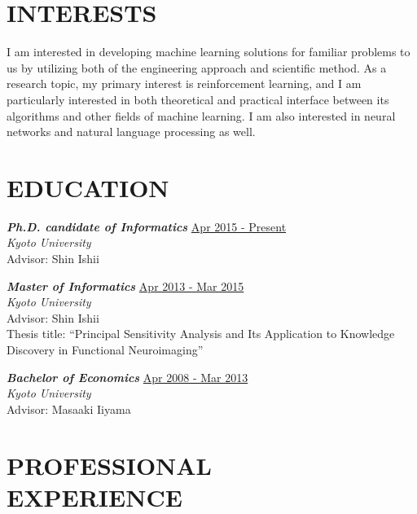 \documentclass[margin, 10pt]{res} %
\begin{document}
\begin{resume}

\section{{\small INTERESTS}}
I am interested in developing machine learning solutions for familiar problems to us by utilizing both of the engineering approach and scientific method.
As a research topic, my primary interest is reinforcement learning, and I am particularly interested in both theoretical and practical interface between its algorithms and other fields of machine learning. 
I am also interested in neural networks and natural language processing as well.


\section{{\small EDUCATION}}

{\sl {\bf Ph.D. candidate of Informatics}} \hfill {\small \underline{Apr 2015 - Present}} \\
{\it Kyoto University} \\
Advisor: Shin Ishii

{\sl {\bf Master of Informatics}} \hfill {\small \underline{Apr 2013 - Mar 2015}}  \\
{\it Kyoto University} \\
Advisor: Shin Ishii \\
Thesis title: ``Principal Sensitivity Analysis and Its Application to Knowledge Discovery in Functional Neuroimaging''

{\sl {\bf Bachelor of Economics}} \hfill {\small \underline{Apr 2008 - Mar 2013}} \\
{\it Kyoto University} \\
Advisor: Masaaki Iiyama
  
\section{{\small PROFESSIONAL\\EXPERIENCE}}


\end{resume}
\end{document}
